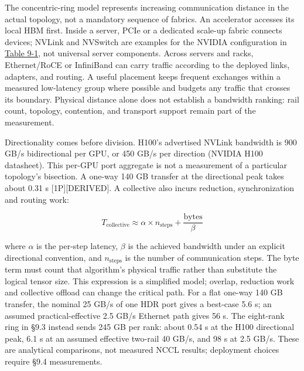 \label{mental-model}


The concentric-ring model represents increasing communication distance
in the actual topology, not a mandatory sequence of fabrics. An
accelerator accesses its local HBM first. Inside a server, PCIe or a
dedicated scale-up fabric connects devices; NVLink and NVSwitch are
examples for the NVIDIA configuration in \hyperref[tab:9.1]{Table 9-1}, not universal server
components. Across servers and racks, Ethernet/RoCE or InfiniBand can
carry traffic according to the deployed links, adapters, and routing. A
useful placement keeps frequent exchanges within a measured low-latency
group where possible and budgets any traffic that crosses its boundary.
Physical distance alone does not establish a bandwidth ranking: rail
count, topology, contention, and transport support remain part of the
measurement.

Directionality comes before division. H100's advertised NVLink bandwidth
is 900 GB/s bidirectional per GPU, or 450 GB/s per direction (NVIDIA
H100 datasheet). This per-GPU port aggregate is not a measurement of a
particular topology's bisection. A one-way 140 GB transfer at the
directional peak takes about 0.31 s \mbox{{[}1P{]}}\hspace{0pt}\mbox{{[}DERIVED{]}}. A collective
also incurs reduction, synchronization and routing work:

\[
T_{\text{collective}} \approx \alpha \times n_\text{steps} + \frac{\text{bytes}}{\beta}
\]

where \(\alpha\) is the per-step latency, \(\beta\) is the achieved
bandwidth under an explicit directional convention, and
\(n_\text{steps}\) is the number of communication steps. The byte term
must count that algorithm's physical traffic rather than substitute the
logical tensor size. This expression is a simplified model; overlap,
reduction work and collective offload can change the critical path. For
a flat one-way 140 GB transfer, the nominal 25 GB/s of one HDR port
gives a best-case 5.6 s; an assumed practical-effective 2.5 GB/s
Ethernet path gives 56 s. The eight-rank ring in §9.3 instead sends 245
GB per rank: about 0.54 s at the H100 directional peak, 6.1 s at an
assumed effective two-rail 40 GB/s, and 98 s at 2.5 GB/s. These are
analytical comparisons, not measured NCCL results; deployment choices
require §9.4 measurements.

